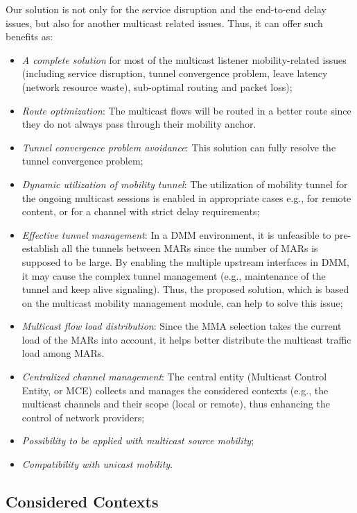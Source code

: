 Our solution is not only for the service disruption and the end-to-end delay issues, but also for another multicast related issues. Thus, it can offer such benefits as:
\begin{itemize}
\item \textit{A complete solution} for most of the multicast listener mobility-related issues (including service disruption, tunnel convergence problem, leave latency (network resource waste), sub-optimal routing and packet loss);
\item \textit{Route optimization}: The multicast flows will be routed in a better route since they do not always pass through their mobility anchor. 
\item \textit{Tunnel convergence problem avoidance}: This solution can fully resolve the tunnel convergence problem;
\item \textit{Dynamic utilization of mobility tunnel}: The utilization of mobility tunnel for the ongoing multicast sessions is enabled in appropriate cases e.g., for remote content, or for a channel with strict delay requirements;
\item \textit{Effective tunnel management}: In a DMM environment, it is unfeasible to pre-establish all the tunnels between MARs since the number of MARs is supposed to be large. By enabling the multiple upstream interfaces in DMM, it may cause the complex tunnel management (e.g., maintenance of the tunnel and keep alive signaling). Thus, the proposed solution, which is based on the multicast mobility management module, can help to solve this issue;
\item \textit{Multicast flow load distribution}: Since the MMA selection takes the current load of the MARs into account, it helps better distribute the multicast traffic load among MARs. 
\item \textit{Centralized channel management}: The central entity (Multicast Control Entity, or MCE) collects and manages the considered contexts (e.g., the multicast channels and their scope (local or remote), thus enhancing the control of network providers;
\item \textit{Possibility to be applied with multicast source mobility};
\item \textit{Compatibility with unicast mobility}.
\end{itemize}

\subsection{Considered Contexts}
